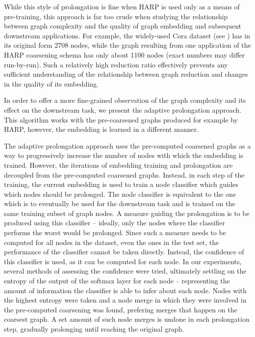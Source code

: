 While this style of prolongation is fine when HARP is used only as a means of pre-training, this approach is far too crude when studying the relationship between graph complexity and the quality of graph embedding and subsequent downstream applications. For example, the widely-used Cora dataset (see \cite{yang_revisiting_2016}) has in its original form 2708 nodes, while the graph resulting from one application of the HARP coarsening schema has only about 1100 nodes (exact numbers may differ run-by-run). Such a relatively high reduction ratio effectively prevents any sufficient understanding of the relationship between graph reduction and changes in the quality of its embedding.

In order to offer a more fine-grained observation of the graph complexity and its effect on the downstream task, we present the adaptive prolongation approach. This algorithm works with the pre-coarsened graphs produced for example by HARP, however, the embedding is learned in a different manner.

The adaptive prolongation approach uses the pre-computed coarsened graphs as a way to progressively increase the number of nodes with which the embedding is trained. However, the iterations of embedding training and prolongation are decoupled from the pre-computed coarsened graphs. Instead, in each step of the training, the current embedding is used to train a node classifier which guides which nodes should be prolonged. The node classifier is equivalent to the one which is to eventually be used for the downstream task and is trained on the same training subset of graph nodes. A measure guiding the prolongation is to be produced using this classifier -- ideally, only the nodes where the classifier performs the worst would be prolonged. Since such a measure needs to be computed for all nodes in the dataset, even the ones in the test set, the performance of the classifier cannot be taken directly. Instead, the confidence of this classifier is used, as it can be computed for each node. In our experiments, several methods of assessing the confidence were tried, ultimately settling on the entropy of the output of the softmax layer for each node -- representing the amount of information the classifier is able to infer about each node. Nodes with the highest entropy were taken and a node merge in which they were involved in the pre-computed coarsening was found, prefering merges that happen on the coarsest graph. A set amount of such node merges is undone in each prolongation step, gradually prolonging until reaching the original graph.

